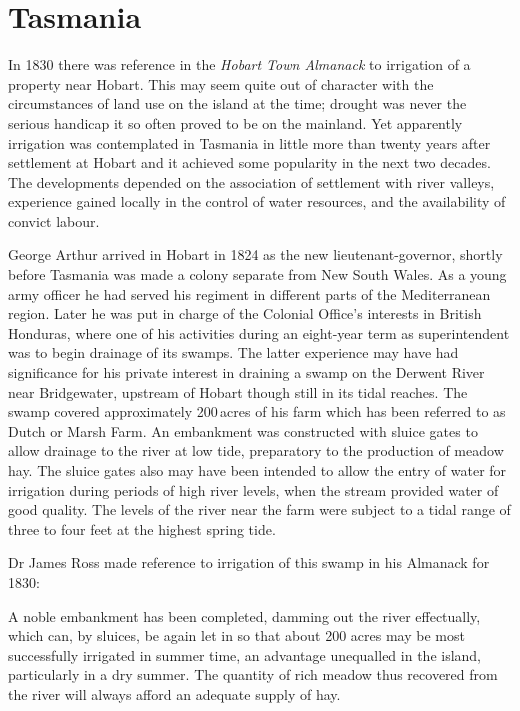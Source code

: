\section*{Tasmania}
\label{sec:tas}

In 1830 there was reference in the \textit{Hobart Town Almanack} to
irrigation of a property near Hobart. This may
seem quite out of character with the circumstances of land use on the
island at the time; drought was never the serious
handicap it so often proved to be on the mainland.  Yet apparently
irrigation was contemplated in Tasmania in little more than twenty
years after settlement at Hobart and it achieved some popularity in
the next two decades.  The developments depended on the association of
settlement with river valleys, experience gained locally in the
control of water resources, and the availability of convict labour.

George Arthur arrived in Hobart in 1824 as the new
lieutenant-gov\-er\-nor, shortly before Tasmania was made a colony
separate from New South Wales.  As a young army officer he had served
his regiment in different parts of the Mediterranean region.  Later he
was put in charge of the Colonial Office's interests in British
Honduras, where one of his activities during an eight-year term as
superintendent was to begin drainage of its swamps.
The latter experience may have had significance for his private
interest in draining a swamp on the Derwent River
near Bridgewater, upstream of Hobart though
still in its tidal reaches. The swamp covered approximately 200\,acres
of his farm which has been referred to as Dutch or Marsh
Farm. An embankment was constructed with
sluice gates to allow
drainage to the river at low tide, preparatory to the
production of meadow hay.  The sluice gates also may have been
intended to allow the entry of water for irrigation during periods of
high river levels, when the stream provided water of good quality.
The levels of the river near the farm were subject to a tidal range of
three to four feet at the highest spring tide.

Dr James Ross  made reference to irrigation of this
swamp in his Almanack for 1830:
\begin{Quote}
	A noble embankment has been completed,
        damming out the river effectually, which
        can, by sluices, be again let in so that about 200 acres may
        be most successfully irrigated in summer time, an advantage
        unequalled in the island, particularly in a dry summer. The
        quantity of rich meadow thus recovered from the river will
        always afford an adequate supply of hay.
\end{Quote}

